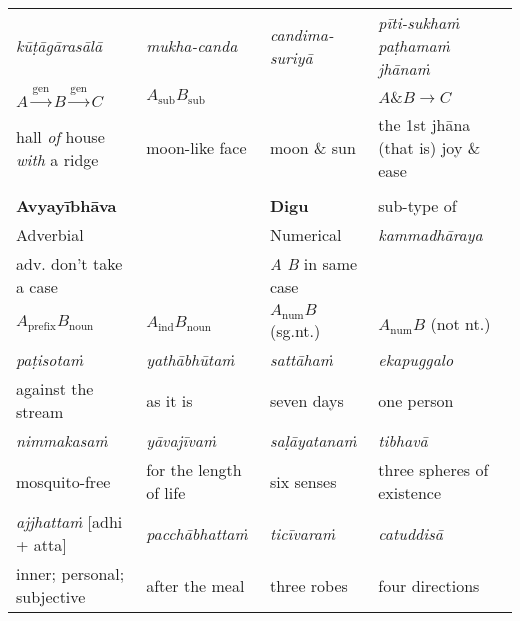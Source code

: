 \documentclass[a4paper]{memoir}
\begin{document}
\begin{minipage}{\linewidth+10pt}
\begin{longtable}{llll}
\hline
\emph{kūṭāgārasālā} & \emph{mukha-canda} & \emph{candima-suriyā} & \emph{pīti-sukhaṁ paṭhamaṁ jhānaṁ}\\[0pt]
\(A \xrightarrow{\text{gen}} B \xrightarrow{\text{gen}} C\) & \(A_{\text{sub}} B_{\text{sub}}\) &  & \(A \mathbin{\&} B \rightarrow C\)\\[0pt]
hall \emph{of} house \emph{with} a ridge & moon-like face & moon \& sun & the 1st jhāna (that is) joy \& ease\\[0pt]
 &  &  & \\[0pt]
\hline
\hline
\textbf{Avyayībhāva} &  & \textbf{Digu} & sub-type of\\[0pt]
Adverbial &  & Numerical & \emph{kammadhāraya}\\[0pt]
\hline
adv. don't take a case &  & \emph{A} \emph{B} in same case & \\[0pt]
\hline
\(A_{\text{prefix}} B_{\text{noun}}\) & \(A_{\text{ind}} B_{\text{noun}}\) & \(A_{\text{num}} B\) (sg.nt.) & \(A_{\text{num}} B\) (not nt.)\\[0pt]
\emph{paṭisotaṁ} & \emph{yathābhūtaṁ} & \emph{sattāhaṁ} & \emph{ekapuggalo}\\[0pt]
against the stream & as it is & seven days & one person\\[0pt]
\emph{nimmakasaṁ} & \emph{yāvajīvaṁ} & \emph{saḷāyatanaṁ} & \emph{tibhavā}\\[0pt]
mosquito-free & for the length of life & six senses & three spheres of existence\\[0pt]
\emph{ajjhattaṁ} [adhi + atta] & \emph{pacchābhattaṁ} & \emph{ticīvaraṁ} & \emph{catuddisā}\\[0pt]
inner; personal; subjective & after the meal & three robes & four directions\\[0pt]
\end{longtable}

\end{minipage}
\end{document}
